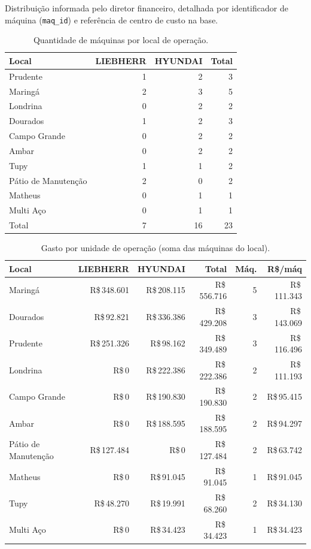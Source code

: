 Distribuição informada pelo diretor financeiro, detalhada por identificador de máquina (\texttt{maq\_id}) e referência de centro de custo na base.

\begin{table}[H]
\centering
\small
\begin{tabular}{lrrr}
\toprule
Local & LIEBHERR & HYUNDAI & Total \\
\midrule
Prudente & 1 & 2 & 3 \\
Maringá & 2 & 3 & 5 \\
Londrina & 0 & 2 & 2 \\
Dourados & 1 & 2 & 3 \\
Campo Grande & 0 & 2 & 2 \\
Ambar & 0 & 2 & 2 \\
Tupy & 1 & 1 & 2 \\
Pátio de Manutenção & 2 & 0 & 2 \\
Matheus & 0 & 1 & 1 \\
Multi Aço & 0 & 1 & 1 \\
Total & 7 & 16 & 23 \\
\bottomrule
\end{tabular}
\caption{Quantidade de máquinas por local de operação.}
\end{table}

\begin{table}[H]
\centering
\small
\begin{tabular}{lrrrrr}
\toprule
Local & LIEBHERR & HYUNDAI & Total & Máq. & R\$/máq \\
\midrule
Maringá & R\$\,348.601 & R\$\,208.115 & R\$\,556.716 & 5 & R\$\,111.343 \\
Dourados & R\$\,92.821 & R\$\,336.386 & R\$\,429.208 & 3 & R\$\,143.069 \\
Prudente & R\$\,251.326 & R\$\,98.162 & R\$\,349.489 & 3 & R\$\,116.496 \\
Londrina & R\$\,0 & R\$\,222.386 & R\$\,222.386 & 2 & R\$\,111.193 \\
Campo Grande & R\$\,0 & R\$\,190.830 & R\$\,190.830 & 2 & R\$\,95.415 \\
Ambar & R\$\,0 & R\$\,188.595 & R\$\,188.595 & 2 & R\$\,94.297 \\
Pátio de Manutenção & R\$\,127.484 & R\$\,0 & R\$\,127.484 & 2 & R\$\,63.742 \\
Matheus & R\$\,0 & R\$\,91.045 & R\$\,91.045 & 1 & R\$\,91.045 \\
Tupy & R\$\,48.270 & R\$\,19.991 & R\$\,68.260 & 2 & R\$\,34.130 \\
Multi Aço & R\$\,0 & R\$\,34.423 & R\$\,34.423 & 1 & R\$\,34.423 \\
\bottomrule
\end{tabular}
\caption{Gasto por unidade de operação (soma das máquinas do local).}
\end{table}

